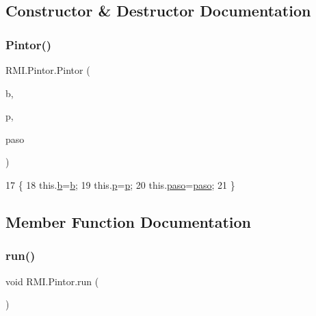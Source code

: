 \subsection{Constructor \& Destructor Documentation}
\mbox{\label{class_r_m_i_1_1_pintor_a1195b9e16a6f759a7ea874d7cc09bbcc}} 
\subsubsection{\texorpdfstring{Pintor()}{Pintor()}}
{\footnotesize\ttfamily R\+M\+I.\+Pintor.\+Pintor (\begin{DoxyParamCaption}\item[{J\+Button}]{b,  }\item[{\mbox{\hyperlink{class_r_m_i_1_1_paleta}{Paleta}}}]{p,  }\item[{\mbox{\hyperlink{class_r_m_i_1_1_paso}{Paso}}}]{paso }\end{DoxyParamCaption})\hspace{0.3cm}{\ttfamily [inline]}}


\begin{DoxyCode}
17     \{
18         this.\mbox{\hyperlink{class_r_m_i_1_1_pintor_a00126f610dce8cd5c3fcf4ea2309515a}{b}}=\mbox{\hyperlink{class_r_m_i_1_1_pintor_a00126f610dce8cd5c3fcf4ea2309515a}{b}};
19         this.\mbox{\hyperlink{class_r_m_i_1_1_pintor_a118c7fad449f069021ee68c9630a123c}{p}}=\mbox{\hyperlink{class_r_m_i_1_1_pintor_a118c7fad449f069021ee68c9630a123c}{p}};
20         this.\mbox{\hyperlink{class_r_m_i_1_1_pintor_a35cc7de76884e55f51a3779eb294e303}{paso}}=\mbox{\hyperlink{class_r_m_i_1_1_pintor_a35cc7de76884e55f51a3779eb294e303}{paso}};
21     \}
\end{DoxyCode}


\subsection{Member Function Documentation}
\mbox{\label{class_r_m_i_1_1_pintor_a52929a5c38a23517fdff48753818d5b6}} 
\subsubsection{\texorpdfstring{run()}{run()}}
{\footnotesize\ttfamily void R\+M\+I.\+Pintor.\+run (\begin{DoxyParamCaption}{ }\end{DoxyParamCaption})\hspace{0.3cm}{\ttfamily [inline]}}


